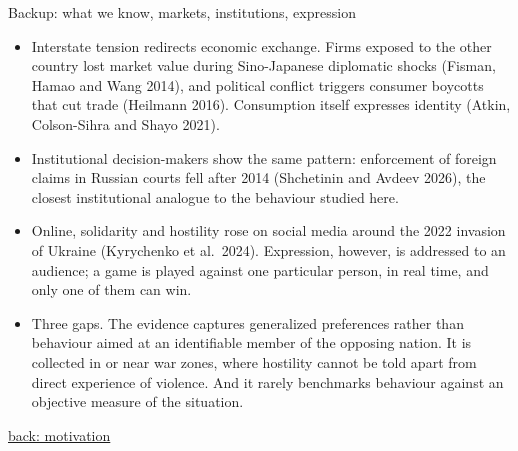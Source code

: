 \documentclass[aspectratio=169,11pt,t]{beamer}
\newcommand{\backto}[2]{\vfill\hfill\hyperlink{#1}{\textcolor{linkblue}{\scriptsize\textsf{back: #2}}}}
\begin{document}
\begin{frame}[label=bk-lit2]{Backup: what we know, markets, institutions, expression}
  \footnotesize
  \begin{itemize}
    \item Interstate tension redirects economic exchange. Firms exposed to the other country lost market value during Sino-Japanese diplomatic shocks (Fisman, Hamao and Wang 2014), and political conflict triggers consumer boycotts that cut trade (Heilmann 2016). Consumption itself expresses identity (Atkin, Colson-Sihra and Shayo 2021).
    \item Institutional decision-makers show the same pattern: enforcement of foreign claims in Russian courts fell after 2014 (Shchetinin and Avdeev 2026), the closest institutional analogue to the behaviour studied here.
    \item Online, solidarity and hostility rose on social media around the 2022 invasion of Ukraine (Kyrychenko et al.\ 2024). Expression, however, is addressed to an audience; a game is played against one particular person, in real time, and only one of them can win.
    \item Three gaps. The evidence captures generalized preferences rather than behaviour aimed at an identifiable member of the opposing nation. It is collected in or near war zones, where hostility cannot be told apart from direct experience of violence. And it rarely benchmarks behaviour against an objective measure of the situation.
  \end{itemize}
  \backto{motivation}{motivation}
\end{frame}

\end{document}
